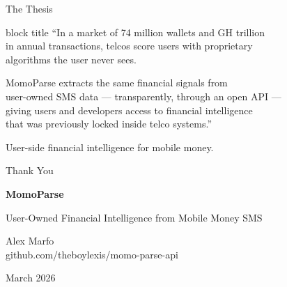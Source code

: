 \documentclass[aspectratio=169, 11pt]{beamer}
\begin{document}
\begin{frame}{The Thesis}
\centering
\vspace{1cm}

\begin{beamercolorbox}[sep=1em, center, rounded=true, shadow=true]{block title}
\large
``In a market of 74 million wallets and GH trillion\\in annual transactions, telcos score users with proprietary\\algorithms the user never sees.

\vspace{0.5cm}

MomoParse extracts the same financial signals from\\user-owned SMS data --- transparently, through an open API ---\\giving users and developers access to financial intelligence\\that was previously locked inside telco systems.''
\end{beamercolorbox}

\vspace{1cm}
\textcolor{mpGray}{User-side financial intelligence for mobile money.}
\end{frame}

\begin{frame}{Thank You}
\centering
\vspace{1.5cm}

{\Large\bfseries MomoParse}

\vspace{0.3cm}
{\textcolor{mpGray}{User-Owned Financial Intelligence from Mobile Money SMS}}

\vspace{1.5cm}

Alex Marfo\\
\textcolor{mpTeal}{github.com/theboylexis/momo-parse-api}

\vspace{1cm}
\textcolor{mpGray}{\footnotesize March 2026}
\end{frame}
\end{document}
